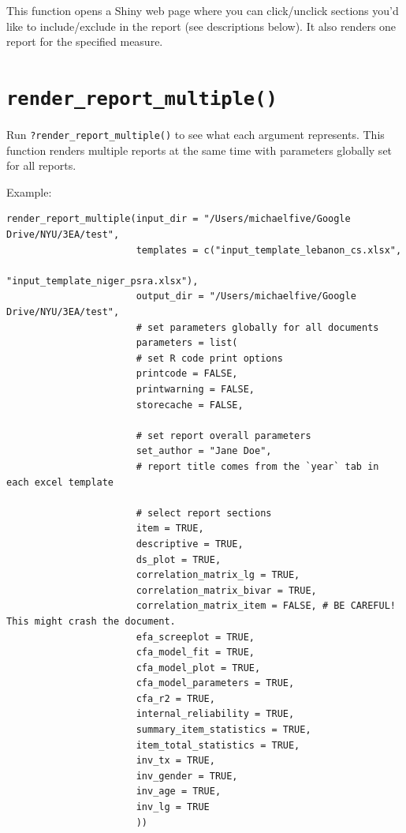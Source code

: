 \documentclass[
]{book}
\begin{document}
This function opens a Shiny web page where you can click/unclick sections you'd like to include/exclude in the report (see descriptions below). It also renders one report for the specified measure.

\hypertarget{render_report_multiple}{%
\section{\texorpdfstring{\texttt{render\_report\_multiple()}}{render\_report\_multiple()}}\label{render_report_multiple}}

Run \texttt{?render\_report\_multiple()} to see what each argument represents. This function renders multiple reports at the same time with parameters globally set for all reports.

Example:

\begin{verbatim}
render_report_multiple(input_dir = "/Users/michaelfive/Google Drive/NYU/3EA/test",
                       templates = c("input_template_lebanon_cs.xlsx",
                                     "input_template_niger_psra.xlsx"),
                       output_dir = "/Users/michaelfive/Google Drive/NYU/3EA/test",
                       # set parameters globally for all documents
                       parameters = list(
                       # set R code print options
                       printcode = FALSE,
                       printwarning = FALSE,
                       storecache = FALSE,

                       # set report overall parameters
                       set_author = "Jane Doe",
                       # report title comes from the `year` tab in each excel template

                       # select report sections
                       item = TRUE,
                       descriptive = TRUE,
                       ds_plot = TRUE,
                       correlation_matrix_lg = TRUE,
                       correlation_matrix_bivar = TRUE,
                       correlation_matrix_item = FALSE, # BE CAREFUL! This might crash the document.
                       efa_screeplot = TRUE,
                       cfa_model_fit = TRUE,
                       cfa_model_plot = TRUE,
                       cfa_model_parameters = TRUE,
                       cfa_r2 = TRUE,
                       internal_reliability = TRUE,
                       summary_item_statistics = TRUE,
                       item_total_statistics = TRUE,
                       inv_tx = TRUE,
                       inv_gender = TRUE,
                       inv_age = TRUE,
                       inv_lg = TRUE
                       ))
\end{verbatim}
\end{document}
